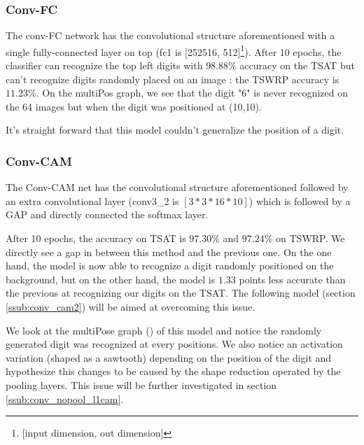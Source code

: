 			\subsubsection{Conv-FC} 
			\label{ssub:conv_fc}
				The conv-FC network has the convolutional structure aforementioned with a single fully-connected layer on top (fc1 is [252516, 512]\footnote{[input dimension, out dimension]}).
				After 10 epochs, the classifier can recognize the top left digits with $98.88\%$ accuracy on the TSAT but can't recognize digits randomly placed on an image : the TSWRP accuracy is $11.23\%$. On the multiPos graph, we see that the digit "6" is never recognized on the 64 images but when the digit was positioned at (10,10).

				\begin{mdframed}[backgroundcolor = gray!30]
					It's straight forward that this model couldn't generalize the position of a digit.
				\end{mdframed}

			\subsubsection{Conv-CAM}
			\label{ssub:conv_cam}
				The Conv-CAM net has the convolutional structure aforementioned followed by an extra convolutional layer (conv3\_2 is $[3*3*16*10]$) which is followed by a GAP and directly connected the softmax layer.

				After 10 epochs, the accuracy on TSAT is $97.30\%$ and $97.24\%$ on TSWRP. We directly see a gap in between this method and the previous one. On the one hand, the model is now able to recognize a digit randomly positioned on the background, but on the other hand, the model is $1.33$ points less accurate than the previous at recognizing our digits on the TSAT. The following model (section \ref{ssub:conv_cam2}) will be aimed at overcoming this issue.

				\begin{mdframed}[backgroundcolor = gray!30]
					We look at the multiPose graph () of this model and notice the randomly generated digit was recognized at every positions. We also notice an activation variation (shaped as a sawtooth) depending on the position of the digit and hypothesize this changes to be caused by the shape reduction operated by the pooling layers. This issue will be further investigated in section \ref{ssub:conv_nopool_l1cam}.
				\end{mdframed}

